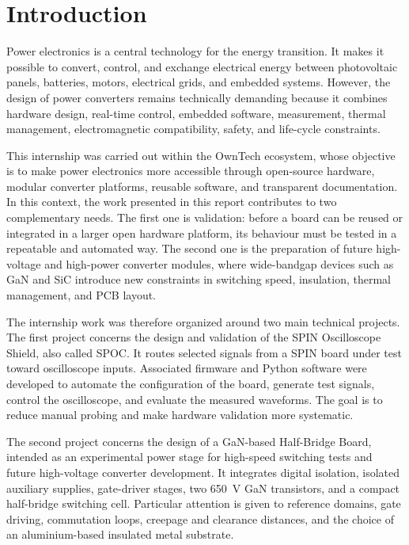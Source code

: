 \chapter*{Introduction}
{}

Power electronics is a central technology for the energy transition. It makes
it possible to convert, control, and exchange electrical energy between
photovoltaic panels, batteries, motors, electrical grids, and embedded systems.
However, the design of power converters remains technically demanding because it
combines hardware design, real-time control, embedded software, measurement,
thermal management, electromagnetic compatibility, safety, and life-cycle
constraints.

\vspace{0.4cm}

This internship was carried out within the OwnTech ecosystem, whose objective
is to make power electronics more accessible through open-source hardware,
modular converter platforms, reusable software, and transparent documentation.
In this context, the work presented in this report contributes to two
complementary needs. The first one is validation: before a board can be reused
or integrated in a larger open hardware platform, its behaviour must be tested
in a repeatable and automated way. The second one is the preparation of future
high-voltage and high-power converter modules, where wide-bandgap devices such
as GaN and SiC introduce new constraints in switching speed, insulation,
thermal management, and PCB layout.

\vspace{0.4cm}

The internship work was therefore organized around two main technical projects.
The first project concerns the design and validation of the SPIN Oscilloscope
Shield, also called SPOC. It routes selected signals from a SPIN board under
test toward oscilloscope inputs. Associated firmware and Python software were
developed to automate the configuration of the board, generate test signals,
control the oscilloscope, and evaluate the measured waveforms. The goal is to
reduce manual probing and make hardware validation more systematic.

\vspace{0.4cm}

The second project concerns the design of a GaN-based Half-Bridge Board,
intended as an experimental power stage for high-speed switching tests and
future high-voltage converter development. It integrates digital isolation,
isolated auxiliary supplies, gate-driver stages, two 650~V GaN transistors, and
a compact half-bridge switching cell. Particular attention is given to reference
domains, gate driving, commutation loops, creepage and clearance distances, and
the choice of an aluminium-based insulated metal substrate.

